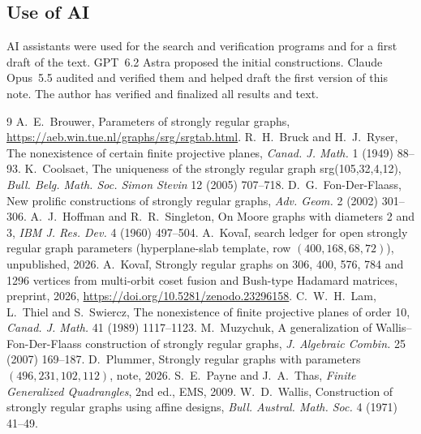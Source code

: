 \documentclass[11pt]{amsart}
\theoremstyle{remark}
\begin{document}
\subsection*{Use of AI}
AI assistants were used for the search and verification programs and for a first draft of the text. GPT~6.2 Astra proposed the initial constructions. Claude Opus~5.5 audited and verified them and helped draft the first version of this note. The author has verified and finalized all results and text.

\begin{thebibliography}{9}
 A.~E.~Brouwer, Parameters of strongly regular graphs, \url{https://aeb.win.tue.nl/graphs/srg/srgtab.html}.
 R.~H.~Bruck and H.~J.~Ryser, The nonexistence of certain finite projective planes, \emph{Canad. J. Math.} 1 (1949) 88--93.
 K.~Coolsaet, The uniqueness of the strongly regular graph srg(105,32,4,12), \emph{Bull. Belg. Math. Soc. Simon Stevin} 12 (2005) 707--718.
 D.~G.~Fon-Der-Flaass, New prolific constructions of strongly regular graphs, \emph{Adv. Geom.} 2 (2002) 301--306.
 A.~J.~Hoffman and R.~R.~Singleton, On Moore graphs with diameters 2 and 3, \emph{IBM J. Res. Dev.} 4 (1960) 497--504.
 A.~Kova\v{l}, search ledger for open strongly regular graph parameters (hyperplane-slab template, row $(400,168,68,72)$), unpublished, 2026.
 A.~Kova\v{l}, Strongly regular graphs on 306, 400, 576, 784 and 1296 vertices from multi-orbit coset fusion and Bush-type Hadamard matrices, preprint, 2026, \url{https://doi.org/10.5281/zenodo.23296158}.
 C.~W.~H.~Lam, L.~Thiel and S.~Swiercz, The nonexistence of finite projective planes of order 10, \emph{Canad. J. Math.} 41 (1989) 1117--1123.
 M.~Muzychuk, A generalization of Wallis--Fon-Der-Flaass construction of strongly regular graphs, \emph{J. Algebraic Combin.} 25 (2007) 169--187.
 D.~Plummer, Strongly regular graphs with parameters $(496,231,102,112)$, note, 2026.
 S.~E.~Payne and J.~A.~Thas, \emph{Finite Generalized Quadrangles}, 2nd ed., EMS, 2009.
 W.~D.~Wallis, Construction of strongly regular graphs using affine designs, \emph{Bull. Austral. Math. Soc.} 4 (1971) 41--49.
\end{thebibliography}
\end{document}
